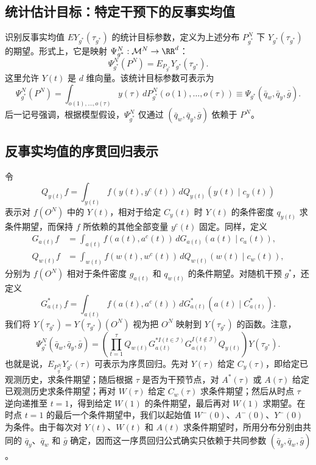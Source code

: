 \subsection{统计估计目标：特定干预下的反事实均值}

识别反事实均值 $EY_{g^*}(\tau_{g^*})$ 的统计目标参数，定义为上述分布 $P_{g^*}^N$ 下 $Y_{g^*}(\tau_{g^*})$ 的期望。形式上，它是映射 $\Psi_{g^*}^N:\mathcal M^N\to\RR^d$：
\[
 \Psi_{g^*}^N(P^N)=E_{P_{g^*}}Y_{g^*}(\tau_{g^*}).
\]
这里允许 $Y(t)$ 是 $d$ 维向量。该统计目标参数可表示为
\[
 \Psi_{g^*}^N(P^N)=\int_{o(1),\ldots,o(\tau)}
 y(\tau)\,dP_{g^*}^N(o(1),\ldots,o(\tau))
 \equiv\Psi_{g^*}(\bar q_w,\bar q_y,\bar g).
\]
后一记号强调，根据模型假设，$\Psi_{g^*}^N$ 仅通过 $(\bar q_w,\bar q_y,\bar g)$ 依赖于 $P^N$。

\subsection{反事实均值的序贯回归表示}

令
\[
 Q_{y(t)}f=\int_{y(t)}f(y(t),y^c(t))\,dQ_{y(t)}(y(t)\mid c_y(t))
\]
表示对 $f(O^N)$ 中的 $Y(t)$，相对于给定 $C_y(t)$ 时 $Y(t)$ 的条件密度 $q_{y(t)}$ 求条件期望，而保持 $f$ 所依赖的其他全部变量 $y^c(t)$ 固定。同样，定义
\[
\begin{aligned}
 G_{a(t)}f&=\int_{a(t)}f(a(t),a^c(t))\,dG_{a(t)}(a(t)\mid c_a(t)),\\
 Q_{w(t)}f&=\int_{w(t)}f(w(t),w^c(t))\,dQ_{w(t)}(w(t)\mid c_w(t)),
\end{aligned}
\]
分别为 $f(O^N)$ 相对于条件密度 $g_{a(t)}$ 和 $q_{w(t)}$ 的条件期望。对随机干预 $g^*$，还定义
\[
 G^*_{a(t)}f=\int_{a(t)}f(a(t),a^c(t))\,dG^*_{a(t)}(a(t)\mid C^*_{a(t)}).
\]
我们将 $Y(\tau_{g^*})=Y(\tau_{g^*})(O^N)$ 视为把 $O^N$ 映射到 $Y(\tau_{g^*})$ 的函数。注意，
\[
 \Psi_{g^*}^N(\bar q_w,\bar q_y,\bar g)
 =\left(\prod_{t=1}^{\tau}Q_{w(t)}G_{a(t)}^{*I(t\in\mathcal I)}
 G_{a(t)}^{I(t\notin\mathcal I)}Q_{y(t)}\right)Y(\tau_{g^*}).
\]
也就是说，$E_{P^N_{g^*}}Y_{g^*}(\tau)$ 可表示为序贯回归。先对 $Y(\tau)$ 给定 $C_y(\tau)$，即给定已观测历史，求条件期望；随后根据 $\tau$ 是否为干预节点，对 $A^*(\tau)$ 或 $A(\tau)$ 给定已观测历史求条件期望；再对 $W(\tau)$ 给定 $C_w(\tau)$ 求条件期望；然后从时点 $\tau$ 逆向递推至 $t=1$，得到给定 $W(1)$ 的条件期望，最后再对 $W(1)$ 求期望。在时点 $t=1$ 的最后一个条件期望中，我们以起始值 $W^-(0)$、$A^-(0)$、$Y^-(0)$ 为条件。由于每次对 $Y(t)$、$W(t)$ 和 $A(t)$ 求条件期望时，所用分布分别由共同的 $\bar q_y$、$\bar q_w$ 和 $\bar g$ 确定，因而这一序贯回归公式确实只依赖于共同参数 $(\bar q_y,\bar q_w,\bar g)$。

